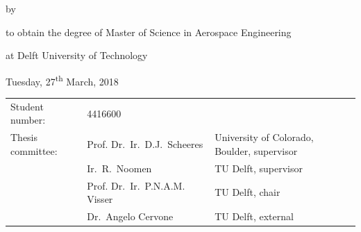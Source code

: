 \begin{titlepage}


\begin{center}


{\makeatletter
\titlestyle
\color{tudelft-cyan}
\fontsize{34}{30}
\selectfont{Orbital motion of regolith around asteroids \par}
\makeatother}

\bigskip
\bigskip
{\makeatletter
\ifx\@subtitle\undefined\else
    \bigskip
   {\tudsffamily\fontsize{16}{32}\selectfont\@subtitle}
\fi
\makeatother}

\bigskip
\bigskip

by

\bigskip
\bigskip

{\makeatletter
\titlestyle\fontsize{26}{26}\selectfont\@author
\makeatother}

\bigskip
\bigskip

to obtain the degree of Master of Science in Aerospace Engineering

at Delft University of Technology

\bigskip\bigskip
Tuesday, 27\textsuperscript{th} March, 2018

\vfill

\begin{tabular}{lll}
    Student number: & 4416600 \\
    Thesis committee: & Prof. Dr.\ Ir.\ D.J.\ Scheeres & University of Colorado, Boulder, supervisor \\
        & Ir.\ R.\ Noomen & TU Delft, supervisor \\
        & Prof. Dr.\ Ir.\ P.N.A.M. Visser\ & TU Delft, chair \\
        & Dr.\ Angelo Cervone\ & TU Delft, external
\end{tabular}


\end{center}
\end{titlepage}
